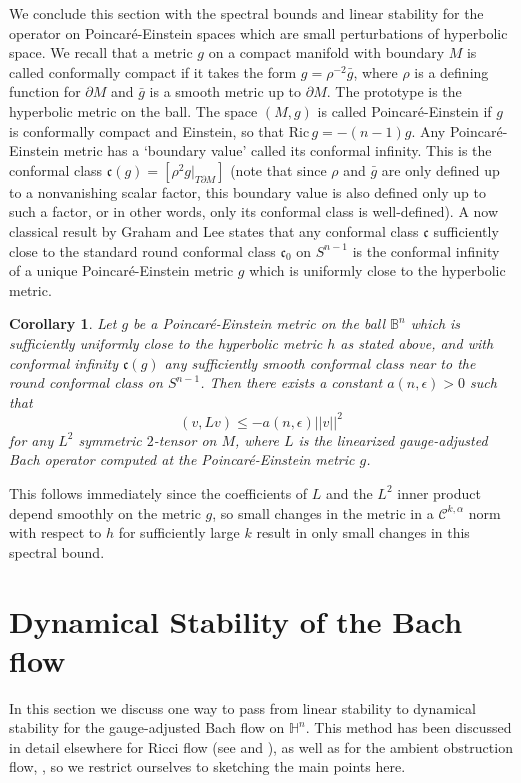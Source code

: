\documentclass[10pt,reqno]{amsart}
\newtheorem{cor}[theorem]{Corollary}
\newcommand{\del}{\partial}
\begin{document}
We conclude this section with the spectral bounds and linear stability for the operator on Poincar\'e-Einstein spaces which are small perturbations of hyperbolic space.  We recall that a metric $g$ on a compact manifold with boundary
$M$ is called conformally compact if it takes the form $g = \rho^{-2} \bar{g}$, where $\rho$ is a defining function for $\del M$ and $\bar{g}$ is a smooth metric up to $\del M$. The prototype is
the hyperbolic metric on the ball. The space $(M,g)$ is called Poincar\'e-Einstein if $g$ is conformally compact and Einstein, so that $\mathrm{Ric}\, g = -(n-1) g$.  Any Poincar\'e-Einstein metric
has a `boundary value' called its conformal infinity. This is the conformal class $\mathfrak c(g) = [ \rho^2 g|_{T \del M}]$ (note that since $\rho$ and $\bar{g}$ are only defined up to a nonvanishing
scalar factor, this boundary value is also defined only up to such a factor, or in other words, only its conformal class is well-defined). A  now classical result by Graham and Lee \cite{GL} 
states that any conformal class $\mathfrak c$ sufficiently close to the standard round conformal class $\mathfrak c_0$ on $S^{n-1}$ is the conformal infinity of a unique Poincar\'e-Einstein
metric $g$ which is uniformly close to the hyperbolic metric.

\begin{cor}
Let $g$ be a Poincar\'e-Einstein metric on the ball $\mathbb{B}^n$ which is sufficiently uniformly close to the hyperbolic metric $h$ as stated above, and with conformal infinity $\mathfrak c(g)$ any sufficiently
smooth conformal class near to the round conformal class on $S^{n-1}$. Then there exists a constant $a(n,\epsilon) > 0$ such that
\[
(v, Lv) \leq -a(n,\epsilon) ||v||^2
\]
for any $L^2$ symmetric $2$-tensor on $M$, where $L$ is the linearized gauge-adjusted Bach operator computed at the Poincar\'e-Einstein metric $g$. 
\label{cor1}
\end{cor}
This follows immediately since the coefficients of $L$ and the $L^2$ inner product depend smoothly on the metric $g$, so small changes in the metric in a $\mathcal C^{k,\alpha}$ norm with respect to $h$ for sufficiently large $k$ result in only small changes in this spectral bound. 

\section{Dynamical Stability of the Bach flow} \label{sec:dynamical}
In this section we discuss one way to pass from linear stability to dynamical stability for the gauge-adjusted Bach flow on $\mathbb H^n$. This
method has been discussed in detail elsewhere for Ricci flow (see \cite{GIK} and \cite{Knopf}), as well as for the ambient obstruction flow, \cite{BGIM}, 
so we restrict ourselves to sketching the main points here.
\end{document}
